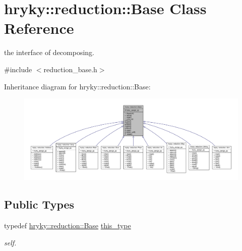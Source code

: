 \hypertarget{classhryky_1_1reduction_1_1_base}{\section{hryky\-:\-:reduction\-:\-:Base Class Reference}
\label{classhryky_1_1reduction_1_1_base}
}


the interface of decomposing.  




{\ttfamily \#include $<$reduction\-\_\-base.\-h$>$}



Inheritance diagram for hryky\-:\-:reduction\-:\-:Base\-:
\nopagebreak
\begin{figure}[H]
\begin{center}
\leavevmode
\includegraphics[width=350pt]{classhryky_1_1reduction_1_1_base__inherit__graph}
\end{center}
\end{figure}
\subsection*{Public Types}
\begin{DoxyCompactItemize}
\item 
\hypertarget{classhryky_1_1reduction_1_1_base_af02a7dee6042080b7380afd2f9500a42}{typedef \hyperlink{classhryky_1_1reduction_1_1_base}{hryky\-::reduction\-::\-Base} \hyperlink{classhryky_1_1reduction_1_1_base_af02a7dee6042080b7380afd2f9500a42}{this\-\_\-type}}\label{classhryky_1_1reduction_1_1_base_af02a7dee6042080b7380afd2f9500a42}

\begin{DoxyCompactList}\small\item\em self. \end{DoxyCompactList}\end{DoxyCompactItemize}
